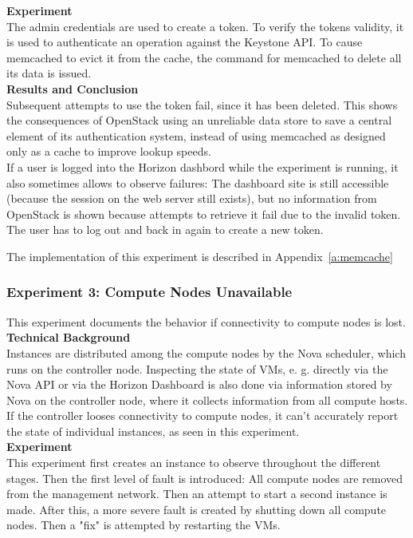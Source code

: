 \textbf{Experiment}\\
The admin credentials are used to create a token. To verify the tokens validity, it is used to authenticate an operation against the Keystone API. To cause memcached to evict it from the cache, the command for memcached to delete all its data is issued. \\

\textbf{Results and Conclusion}\\
Subsequent attempts to use the token fail, since it has been deleted. This shows the consequences of OpenStack using an unreliable data store to save a central element of its authentication system, instead of using memcached as designed only as a cache to improve lookup speeds. \\

If a user is  logged into the Horizon dashbord while the experiment is running, it also sometimes allows to observe failures: The dashboard site is still accessible (because the session on the web server still exists), but no information from OpenStack is shown because attempts to retrieve it fail due to the invalid token. The user has to log out and back in again to create a new token. 

The implementation of this experiment is described in Appendix~\ref{a:memcache}

\subsubsection{Experiment 3: Compute Nodes Unavailable}
This experiment documents the behavior if connectivity to compute nodes is lost.\\

\textbf{Technical Background}\\
Instances are distributed among the compute nodes by the Nova scheduler, which runs on the controller node. Inspecting the state of VMs, e. g. directly via the Nova API or via the Horizon Dashboard is also done via information stored by Nova on the controller node, where it collects information from all compute hosts.\\
If the controller looses connectivity to compute nodes, it can't accurately report the state of individual instances, as seen in this experiment. \\

\textbf{Experiment}\\
This experiment first creates an instance to observe throughout the different stages. Then the first level of fault is introduced: All compute nodes are removed from the management network. Then an attempt to start a second instance is made. After this, a more severe fault is created by shutting down all compute nodes. Then a "fix" is attempted by restarting the VMs.\\

